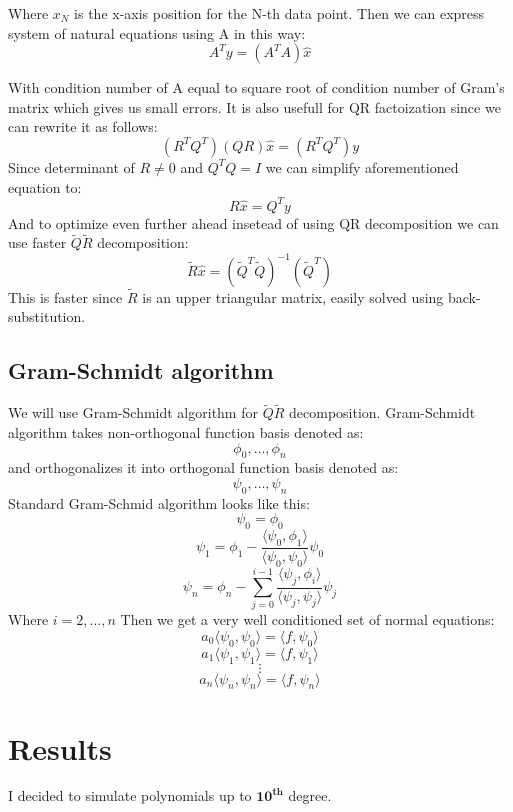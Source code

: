 \documentclass[12pt]{report}
\begin{document}
Where $x_N$ is the x-axis position for the N-th data point. Then we can express system of natural equations using A in this way:
\[ A^Ty = (A^TA)\hat{x} \]

With condition number of A equal to square root of condition number of Gram's matrix which gives us small errors. It is also usefull for QR factoization since we can rewrite it as follows:
\[ (R^TQ^T)(QR)\hat{x} = (R^TQ^T)y \]
Since determinant of $R \neq 0$ and $Q^TQ = I$ we can simplify aforementioned equation to:
\[ R\hat{x} = Q^Ty \]
And to optimize even further ahead insetead of using QR decomposition we can use faster $\tilde{Q}\tilde{R}$ decomposition:
\[ \tilde{R}\hat{x} = (\tilde{Q}^T\tilde{Q})^{-1}(\tilde{Q}^T) \]
This is faster since $\tilde{R}$ is an upper triangular matrix, easily solved using back-substitution.

\subsection{Gram-Schmidt algorithm}
We will use Gram-Schmidt algorithm for $\tilde{Q}\tilde{R}$ decomposition.
Gram-Schmidt algorithm takes non-orthogonal function basis denoted as:
\[ \phi_0, \dots, \phi_n \]
and orthogonalizes it into orthogonal function basis denoted as:
\[ \psi_0, \dots, \psi_n \]
Standard Gram-Schmid algorithm looks like this:
\[ \psi_0 = \phi_0 \]
\[ \psi_1 = \phi_1 - \frac{\langle \psi_0, \phi_1 \rangle}{\langle \psi_0, \psi_0 \rangle} \psi_0 \]
\[ \psi_n = \phi_n - \sum_{j = 0}^{i-1}  \frac{\langle \psi_j, \phi_i \rangle}{\langle \psi_j, \psi_j \rangle} \psi_j \]
Where $ i = 2, \dots, n $
Then we get a very well conditioned set of normal equations:
\[ a_0\langle \psi_0, \psi_0 \rangle = \langle f, \psi_0 \rangle \]
\[ a_1\langle \psi_1, \psi_1 \rangle = \langle f, \psi_1 \rangle \]
\[ \vdots \]
\[ a_n\langle \psi_n, \psi_n \rangle = \langle f, \psi_n \rangle \]

\section{Results}

I decided to simulate polynomials up to $\mathbf{10^{th}}$ degree.













\end{document}
